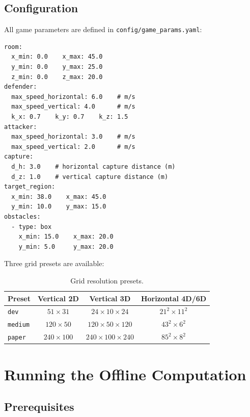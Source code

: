 \documentclass[11pt,a4paper]{article}
\begin{document}
\subsection{Configuration}

All game parameters are defined in \texttt{config/game\_params.yaml}:

\begin{lstlisting}[style=yamlstyle, title=\textbf{Key parameters from game\_params.yaml}]
room:
  x_min: 0.0    x_max: 45.0
  y_min: 0.0    y_max: 25.0
  z_min: 0.0    z_max: 20.0
defender:
  max_speed_horizontal: 6.0    # m/s
  max_speed_vertical: 4.0      # m/s
  k_x: 0.7    k_y: 0.7    k_z: 1.5
attacker:
  max_speed_horizontal: 3.0    # m/s
  max_speed_vertical: 2.0      # m/s
capture:
  d_h: 3.0    # horizontal capture distance (m)
  d_z: 1.0    # vertical capture distance (m)
target_region:
  x_min: 38.0    x_max: 45.0
  y_min: 10.0    y_max: 15.0
obstacles:
  - type: box
    x_min: 15.0    x_max: 20.0
    y_min: 5.0     y_max: 20.0
\end{lstlisting}

Three grid presets are available:

\begin{table}[h]
\centering
\caption{Grid resolution presets.}
\begin{tabular}{lccc}
\toprule
\textbf{Preset} & \textbf{Vertical 2D} & \textbf{Vertical 3D} & \textbf{Horizontal 4D/6D} \\
\midrule
\texttt{dev} & $51 \times 31$ & $24 \times 10 \times 24$ & $21^2 \times 11^2$ \\
\texttt{medium} & $120 \times 50$ & $120 \times 50 \times 120$ & $43^2 \times 6^2$ \\
\texttt{paper} & $240 \times 100$ & $240 \times 100 \times 240$ & $85^2 \times 8^2$ \\
\bottomrule
\end{tabular}
\end{table}


\section{Running the Offline Computation}

\subsection{Prerequisites}
\end{document}
